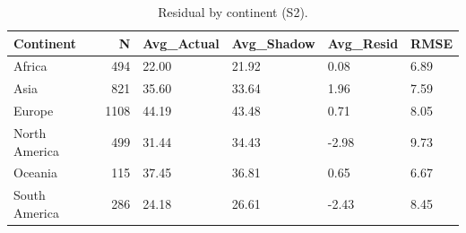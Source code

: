 \begin{table}

\caption{\label{tab:tab:shadow_continent}Residual by continent (S2).}
\centering
\begin{tabular}[t]{lrllll}
\toprule
Continent & N & Avg\_Actual & Avg\_Shadow & Avg\_Resid & RMSE\\
\midrule
Africa & 494 & 22.00 & 21.92 & 0.08 & 6.89\\
Asia & 821 & 35.60 & 33.64 & 1.96 & 7.59\\
Europe & 1108 & 44.19 & 43.48 & 0.71 & 8.05\\
North America & 499 & 31.44 & 34.43 & -2.98 & 9.73\\
Oceania & 115 & 37.45 & 36.81 & 0.65 & 6.67\\
\addlinespace
South America & 286 & 24.18 & 26.61 & -2.43 & 8.45\\
\bottomrule
\end{tabular}
\end{table}
